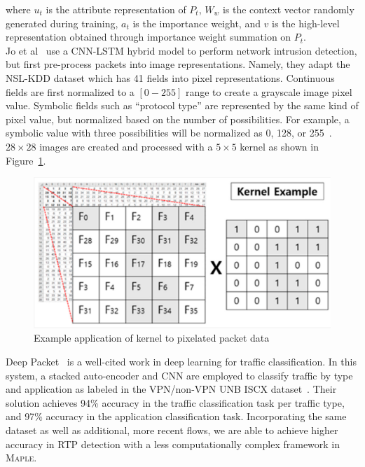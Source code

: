where $u_t$ is the attribute representation of $P_t$, $W_w$ is the context vector randomly generated during training, $a_t$ is the importance weight, and $v$ is the high-level representation obtained through importance weight summation on $P_t$. \\

Jo et al~\cite{jo2020packet} use a CNN-LSTM hybrid model to perform network intrusion detection, but first pre-process packets into image representations. Namely, they adapt the NSL-KDD dataset which has 41 fields into pixel representations. Continuous fields are first normalized to a $[0-255]$ range to create a grayscale image pixel value. Symbolic fields such as ``protocol type'' are represented by the same kind of pixel value, but normalized based on the number of possibilities. For example, a symbolic value with three possibilities will be normalized as 0, 128, or 255~\cite{jo2020packet}. $28 \times 28$ images are created and processed with a $5 \times 5$ kernel as shown in Figure~\ref{fig:kernel}.

\begin{figure} [h!]
\includegraphics[width=\linewidth]{chapters/5/img/kernel.png}
\caption{Example application of kernel to pixelated packet data~\cite{jo2020packet}}
\label{fig:kernel}
\end{figure}

Deep Packet~\cite{deeppacket} is a well-cited work in deep learning for traffic classification. In this system, a stacked auto-encoder and CNN are employed to classify traffic by type and application as labeled in the VPN/non-VPN UNB ISCX dataset~\cite{vpn-dataset}. Their solution achieves 94\% accuracy in the traffic classification task per traffic type, and 97\% accuracy in the application classification task. Incorporating the same dataset as well as additional, more recent flows, we are able to achieve higher accuracy in RTP detection with a less computationally complex framework in \textsc{Maple}.
